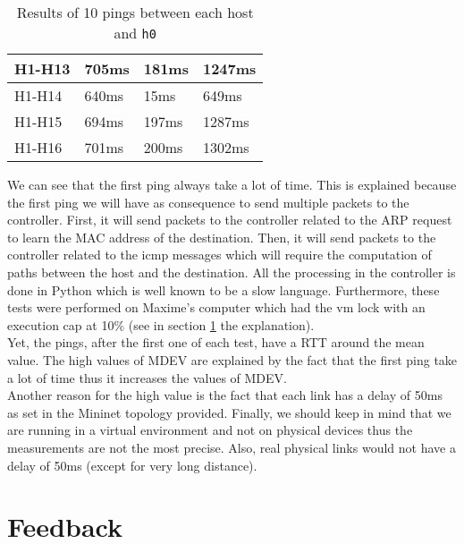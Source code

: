 \documentclass[a4paper, 11pt, oneside]{article}
\begin{document}
\begin{table}[]
\begin{tabular}{|l|l|l|l|}
H1-H13                                     & 705ms                              & 181ms                              & 1247ms                                 \\ \hline
H1-H14                                     & 640ms                              & 15ms                              & 649ms                                 \\ \hline
H1-H15                                     & 694ms                              & 197ms                              & 1287ms                                 \\ \hline
H1-H16                                     & 701ms                              & 200ms                              & 1302ms                                 \\ \hline
\end{tabular}
\caption{Results of 10 pings between each host and \texttt{h0}}
\label{table:STCPings}
\end{table}
We can see that the first ping always take a lot of time. This is explained because the first ping we will have as consequence to send multiple packets to the controller. First, it will send packets to the controller related to the ARP request to learn the MAC address of the destination. Then, it will send packets to the controller related to the icmp messages which will require the computation of paths between the host and the destination. All the processing in the controller is done in Python which is well known to be a slow language. Furthermore, these tests were performed on Maxime's computer which had the vm lock with an execution cap at 10\% (see in section \ref{sec:feedback} the explanation).\\
Yet, the pings, after the first one of each test, have a RTT around the mean value. The high values of MDEV are explained by the fact that the first ping take a lot of time thus it increases the values of MDEV.\\
Another reason for the high value is the fact that each link has a delay of 50ms as set in the Mininet topology provided. Finally, we should keep in mind that we are running in a virtual environment and not on physical devices thus the measurements are not the most precise. Also, real physical links would not have a delay of 50ms (except for very long distance).


\section{Feedback} \label{sec:feedback}
\end{document}
